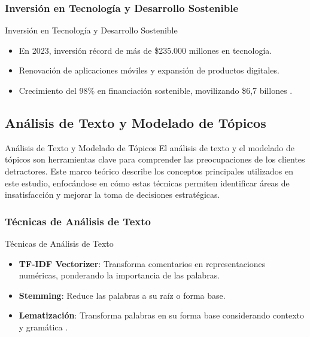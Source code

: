 \documentclass[aspectratio=169, xcolor={dvipsnames}, 10pt, spanish]{beamer}
\begin{document}
\subsubsection{Inversión en Tecnología y Desarrollo Sostenible}
\begin{frame}{Inversión en Tecnología y Desarrollo Sostenible}
    \begin{itemize}
        \item En 2023, inversión récord de más de \$235.000 millones en tecnología.
        \item Renovación de aplicaciones móviles y expansión de productos digitales.
        \item Crecimiento del 98\% en financiación sostenible, movilizando \$6,7 billones \cite{4}.
    \end{itemize}
\end{frame}

\subsection{Análisis de Texto y Modelado de Tópicos}
\begin{frame}{Análisis de Texto y Modelado de Tópicos}
    El análisis de texto y el modelado de tópicos son herramientas clave para comprender las preocupaciones de los clientes detractores. Este marco teórico describe los conceptos principales utilizados en este estudio, enfocándose en cómo estas técnicas permiten identificar áreas de insatisfacción y mejorar la toma de decisiones estratégicas.
\end{frame}

\subsubsection{Técnicas de Análisis de Texto}
\begin{frame}{Técnicas de Análisis de Texto}
    \begin{itemize}
        \item \textbf{TF-IDF Vectorizer}: Transforma comentarios en representaciones numéricas, ponderando la importancia de las palabras.
        \item \textbf{Stemming}: Reduce las palabras a su raíz o forma base.
        \item \textbf{Lematización}: Transforma palabras en su forma base considerando contexto y gramática \cite{8}.
    \end{itemize}
\end{frame}
\end{document}
